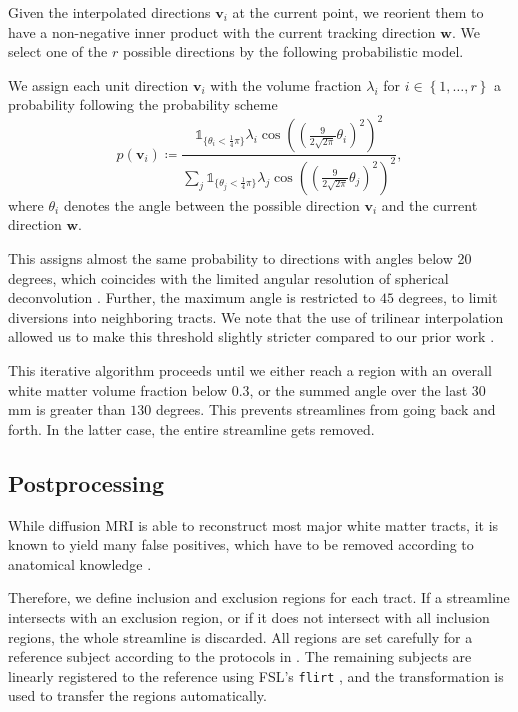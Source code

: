 Given the interpolated directions $\mathbf{v}_i$ at the current point, we
reorient them to have a non-negative inner product with the current tracking
direction $\mathbf{w}$. We select one of the $r$ possible directions by the
following probabilistic model.

We assign each unit direction $\mathbf{v}_i$ with the volume fraction
$\lambda_i$ for $i \in \left\{ 1 , \dots , r \right\}$ a probability following the probability
scheme 
\[
	p \left( \mathbf{v}_i \right) \coloneqq \frac{ \mathbb{1}_{\lbrace\theta_i <
		\frac{1}{4} \pi \rbrace} \lambda_i \cos \left( \left( \frac{9}{2\sqrt{2
\pi}} \theta_i \right)^2 \right)^2}{\sum_j \mathbb{1}_{\lbrace\theta_j <
		\frac{1}{4} \pi \rbrace} \lambda_j \cos \left( \left( \frac{9}{2\sqrt{2
\pi}} \theta_j \right)^2 \right)^2 }, 
\]
where $\theta_i$ denotes the angle between the possible direction $\mathbf{v}_i$
and the current direction $\mathbf{w}$. 

This assigns almost the same probability to directions with angles below 20 degrees, which coincides with the limited angular resolution of
spherical deconvolution \cite{TOURNIER20071459}. Further, the maximum angle is
restricted to $45$ degrees, to limit diversions into neighboring tracts. We note that the use of trilinear interpolation allowed us to make this threshold slightly stricter compared to our prior work \cite{Gruen:2021}.

This iterative algorithm proceeds until we either reach a region with an overall white matter volume fraction below $0.3$, or the summed angle over the last $30$ mm is greater than
$130$ degrees. This prevents streamlines from going back and forth. In the latter case,
the entire streamline gets removed. 

\subsection{Postprocessing}
\label{sec:postprocessing}
While diffusion MRI is able to reconstruct most major white
matter tracts, it is known to yield many false
positives, which have to be removed according to anatomical knowledge
\cite{MaierHein:2017}. %

Therefore, we define inclusion and exclusion regions for each tract. If a streamline intersects with an exclusion region, or if it  does not intersect with all inclusion regions, the whole streamline is discarded. All regions
are set carefully for a reference subject according to the protocols in
\cite{Wakana:2007}.
The remaining subjects are linearly registered to the reference using FSL's \texttt{flirt} \cite{FSL}, and the transformation is used to transfer the regions automatically.

